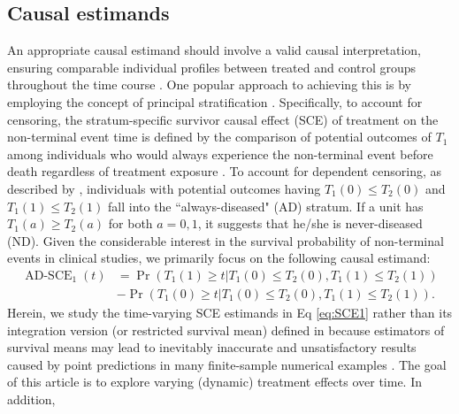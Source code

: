 \documentclass[aoas]{imsart}
\theoremstyle{plain}
\def\Pr{\operatorname{Pr}}
\begin{document}
\subsection{Causal estimands}
An appropriate causal estimand should involve a valid causal interpretation, ensuring comparable individual profiles between treated and control groups throughout the time course \citep{Nevo2022semicompeting}. One popular approach to achieving this is by employing the concept of principal stratification \citep{frangakis2002principal,rubin2006causal,ding2011identifiability,dai2012partially}. Specifically, to account for censoring, the stratum-specific survivor causal effect (SCE) of treatment on the non-terminal event time is defined by the comparison of potential outcomes of $T_1$ among individuals who would always experience the non-terminal event before death regardless of treatment exposure \citep{tchetgen2014identification}. To account for dependent censoring, as described by \cite{Nevo2022semicompeting}, individuals with potential outcomes having $T_1(0)\leq T_2(0)$ and $T_1(1)\leq T_2(1)$ fall into the ``always-diseased" (AD) stratum. If a unit has $T_1(a)\geq T_2(a)$ for both $a=0,1$, it suggests that he/she is never-diseased (ND). 
Given the considerable interest in the survival probability of non-terminal events in clinical studies, we primarily focus on the following causal estimand:
\begin{equation}
\begin{split}
\operatorname{AD-SCE}_1(t)
&=\Pr(T_1(1)\geq t|T_1(0)\leq T_2(0),T_1(1)\leq T_2(1))\\
&-\Pr(T_1(0)\geq t|T_1(0)\leq T_2(0),T_1(1)\leq T_2(1)).
\label{eq:SCE1}
\end{split}
\end{equation}
Herein, we study the time-varying SCE estimands in Eq \eqref{eq:SCE1} rather than its integration version (or restricted survival mean) defined in \cite{Nevo2022semicompeting} because estimators of survival means may lead to inevitably inaccurate and unsatisfactory results caused by point predictions in many finite-sample numerical examples \citep{graf1999assessment}. The goal of this article is to explore varying  (dynamic) treatment effects over time. In addition, 
\end{document}
